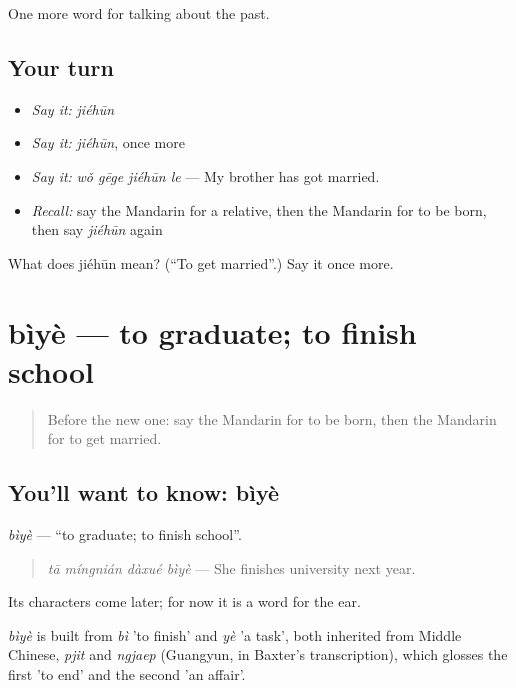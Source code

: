 \begin{grammarlens}[title={What you've built}]
One more word for talking about the past.
\end{grammarlens}

\subsection*{Your turn}
\begin{itemize}
\raggedright
  \item \emph{Say it:} \emph{jiéhūn}
  \item \emph{Say it:} \emph{jiéhūn}, once more
  \item \emph{Say it:} \emph{wǒ gēge jiéhūn le} — My brother has got married.
  \item \emph{Recall:} say the Mandarin for a relative, then the Mandarin for to be born, then say \emph{jiéhūn} again
\end{itemize}

\begin{tcolorbox}[breakable,colback=teal!4,colframe=teal!35!black,title={Before you move on}]
What does jiéhūn mean? (\textquotedblleft{}To get married\textquotedblright{}.) Say it once more.
\end{tcolorbox}
\section[bìyè]{bìyè — to graduate; to finish school}

\label{lesson:ZH-C254-biye}



\begin{quote}
Before the new one: say the Mandarin for to be born, then the Mandarin for to get married.
\end{quote}

\subsection*{You'll want to know: bìyè}
\emph{bìyè} — \textquotedblleft{}to graduate; to finish school\textquotedblright{}.

\begin{quote}
\emph{tā míngnián dàxué bìyè} — She finishes university next year.
\end{quote}

Its characters come later; for now it is a word for the ear.

\begin{cousinweb}
\emph{bìyè} is built from \emph{bì} 'to finish' and \emph{yè} 'a task', both inherited from Middle Chinese, \emph{pjit} and \emph{ngjaep} (Guangyun, in Baxter's transcription), which glosses the first 'to end' and the second 'an affair'.
\end{cousinweb}

